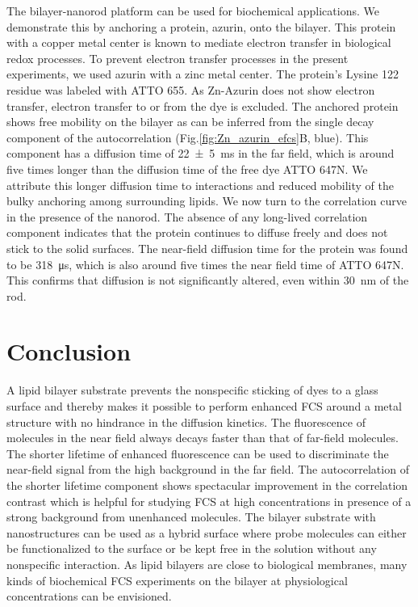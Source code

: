The bilayer-nanorod platform can be used for biochemical applications.
We demonstrate this by anchoring a protein, azurin, onto the bilayer.
This protein with a copper metal center is known to mediate electron transfer in biological redox processes.\cite{kolczak2006azurin,Vijgenboom1997invivo}
To prevent electron transfer processes in the present experiments, we used azurin with a zinc metal center.
The protein's Lysine 122 residue was labeled with ATTO 655. 
As Zn-Azurin does not show electron transfer, electron transfer to or from the dye is excluded.
The anchored protein shows free mobility on the bilayer as can be inferred from the single decay component of the autocorrelation (Fig.\ref{fig:Zn_azurin_efcs}B, blue).
This component has a diffusion time of \SI[separate-uncertainty = true]{22(5)}{\ms} in the far field, which is around five times longer than the diffusion time of the free dye ATTO 647N.
We attribute this longer diffusion time to interactions and reduced mobility of the bulky anchoring among surrounding lipids. 
We now turn to the correlation curve in the presence of the nanorod.
The absence of any long-lived correlation component indicates that the protein continues to diffuse freely and does not stick to the solid surfaces. 
The near-field diffusion time for the protein was found to be \SI{318}{\us}, which is also around five times the near field time of ATTO 647N.
This confirms that diffusion is not significantly altered, even within \SI{30}{\nm} of the rod.

\section{Conclusion}
A lipid bilayer substrate prevents the nonspecific sticking of dyes to a glass surface and thereby makes it possible to perform enhanced FCS around a metal structure with no hindrance in the diffusion kinetics.
The fluorescence of molecules in the near field always decays faster than that of far-field molecules.
The shorter lifetime of enhanced fluorescence can be used to discriminate the near-field signal from the high background in the far field.
The autocorrelation of the shorter lifetime component shows spectacular improvement in the correlation contrast which is helpful for studying FCS at high concentrations in presence of a strong background from unenhanced molecules.
The bilayer substrate with nanostructures can be used as a hybrid surface where probe molecules can either be functionalized to the surface or be kept free in the solution without any nonspecific interaction.
As lipid bilayers are close to biological membranes, many kinds of biochemical FCS experiments on the bilayer at physiological concentrations can be envisioned.

